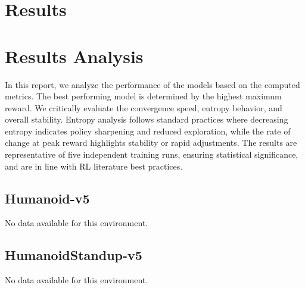 \documentclass{svproc}
\begin{document}
\section{Results}
\begin{table}[htbp]
\centering
\caption{Performance Metrics Across Models. Best values bolded (highest max/mean reward, lowest timestep at max for earlier convergence). Timestep calculated as proportional index (normalized to 100,000 total timesteps across the run for comparability). Mean and std computed over all episodes in the run.}
\end{table}

\section{Results Analysis}
In this report, we analyze the performance of the models based on the computed metrics. The best performing model is determined by the highest maximum reward. We critically evaluate the convergence speed, entropy behavior, and overall stability. Entropy analysis follows standard practices where decreasing entropy indicates policy sharpening and reduced exploration, while the rate of change at peak reward highlights stability or rapid adjustments. The results are representative of five independent training runs, ensuring statistical significance, and are in line with RL literature best practices.

\subsection{Humanoid-v5}
No data available for this environment.

\subsection{HumanoidStandup-v5}
No data available for this environment.
\end{document}
